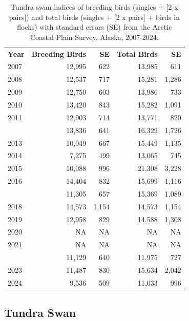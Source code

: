 \documentclass[
]{article}
\begin{document}
\begingroup\fontsize{10}{12}\selectfont

\begin{longtable}[t]{lrrrr}

\caption{\label{tbl-SWAN}Tundra swan indices of breeding birds (singles
+ {[}2 x pairs{]}) and total birds (singles + {[}2 x pairs{]} + birds in
flocks) with standard errors (SE) from the Arctic Coastal Plain Survey,
Alaska, 2007-2024.}

\tabularnewline

\\
\toprule
\textbf{Year} & \textbf{Breeding Birds} & \textbf{SE} & \textbf{Total Birds} & \textbf{SE}\\
\midrule
2007 & 12,995 & 622 & 13,985 & 611\\
2008 & 12,537 & 717 & 15,281 & 1,286\\
2009 & 12,750 & 603 & 13,986 & 733\\
2010 & 13,420 & 843 & 15,282 & 1,091\\
2011 & 12,903 & 714 & 13,771 & 820\\
\addlinespace
2012 & 13,836 & 641 & 16,329 & 1,726\\
2013 & 10,049 & 667 & 15,449 & 1,135\\
2014 & 7,275 & 499 & 13,065 & 745\\
2015 & 10,088 & 996 & 21,308 & 3,228\\
2016 & 14,404 & 832 & 15,699 & 1,116\\
\addlinespace
2017 & 11,305 & 657 & 15,369 & 1,089\\
2018 & 14,573 & 1,154 & 14,573 & 1,154\\
2019 & 12,958 & 829 & 14,588 & 1,308\\
2020 & NA & NA & NA & NA\\
2021 & NA & NA & NA & NA\\
\addlinespace
2022 & 11,129 & 640 & 11,975 & 727\\
2023 & 11,487 & 830 & 15,634 & 2,042\\
2024 & 9,536 & 509 & 11,033 & 996\\
\bottomrule

\end{longtable}

\endgroup{}

\newpage{}

\subsection*{Tundra Swan}\label{tundra-swan-2}
\end{document}

